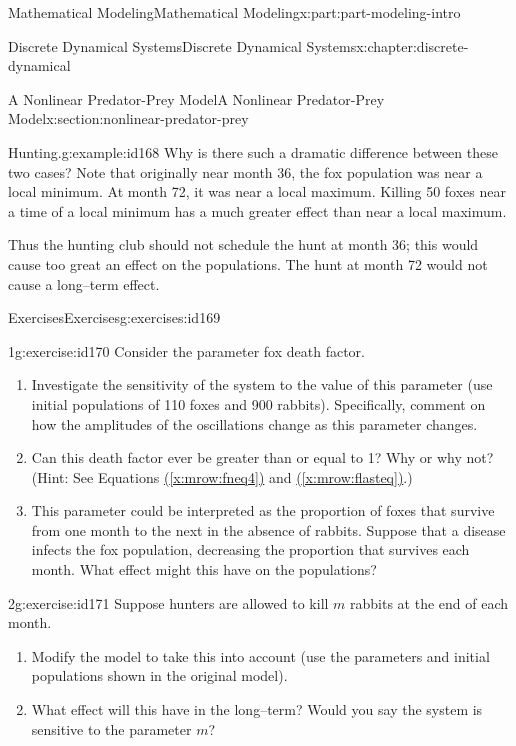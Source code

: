 \documentclass[oneside,10pt,]{book}
\newcommand{\xreffont}{\relax}
\numberwithin{equation}{section}
\begin{document}
\begin{partptx}{Mathematical Modeling}{}{Mathematical Modeling}{}{}{x:part:part-modeling-intro}
\begin{chapterptx}{Discrete Dynamical Systems}{}{Discrete Dynamical Systems}{}{}{x:chapter:discrete-dynamical}
\begin{sectionptx}{A Nonlinear Predator-Prey Model}{}{A Nonlinear Predator-Prey Model}{}{}{x:section:nonlinear-predator-prey}
\begin{example}{Hunting.}{g:example:id168}
Why is there such a dramatic difference between these two cases? Note that originally near month 36, the fox population was near a local minimum. At month 72, it was near a local maximum. Killing 50 foxes near a time of a local minimum has a much greater effect than near a local maximum.%
\par
Thus the hunting club should not schedule the hunt at month 36; this would cause too great an effect on the populations. The hunt at month 72 would not cause a long–term effect.%
\end{example}
%
%
\typeout{************************************************}
\typeout{************************************************}
%
\begin{exercises-subsection-numberless}{Exercises}{}{Exercises}{}{}{g:exercises:id169}
\begin{divisionexercise}{1}{}{}{g:exercise:id170}%
Consider the parameter fox death factor.%
\begin{enumerate}[font=\bfseries,label=(\alph*),ref=\alph*]
\item{}Investigate the sensitivity of the system to the value of this parameter (use initial populations of 110 foxes and 900 rabbits). Specifically, comment on how the amplitudes of the oscillations change as this parameter changes.%
\item{}Can this death factor ever be greater than or equal to 1? Why or why not? (Hint: See Equations \hyperref[x:mrow:fneq4]{({\xreffont\ref{x:mrow:fneq4}})} and \hyperref[x:mrow:flasteq]{({\xreffont\ref{x:mrow:flasteq}})}.)%
\item{}This parameter could be interpreted as the proportion of foxes that survive from one month to the next in the absence of rabbits. Suppose that a disease infects the fox population, decreasing the proportion that survives each month. What effect might this have on the populations?%
\end{enumerate}
\end{divisionexercise}%
\begin{divisionexercise}{2}{}{}{g:exercise:id171}%
Suppose hunters are allowed to kill \(m\) rabbits at the end of each month.%
\begin{enumerate}[font=\bfseries,label=(\alph*),ref=\alph*]
\item{}Modify the model to take this into account (use the parameters and initial populations shown in the original model).%
\item{}What effect will this have in the long–term? Would you say the system is sensitive to the parameter \(m\)?%

\end{enumerate}
\end{divisionexercise}
\end{exercises-subsection-numberless}
\end{sectionptx}
\end{chapterptx}
\end{partptx}
\end{document}
